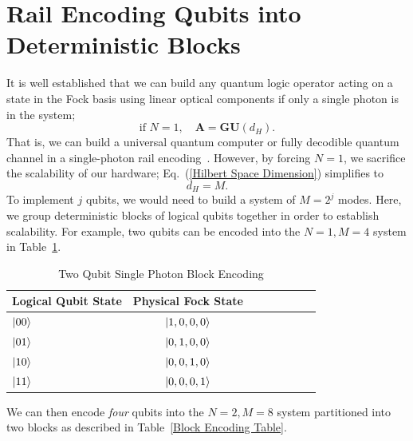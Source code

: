 \documentclass[aps,pra,twocolumn,showpacs,superscriptaddress,floatfix,10pt]{revtex4}
\begin{document}
\section{Rail Encoding Qubits into Deterministic Blocks}
\label{Section Block Encoding}
It is well established that we can build any quantum logic operator acting on a state in the Fock basis using linear optical components if only a single photon is in the system;
\begin{equation}
\label{Isomorphism}
	\mbox{if } N=1, \quad \textbf{A} = \textbf{GU}(d_H).
\end{equation}
That is, we can build a universal quantum computer or fully decodible quantum channel in a single-photon rail encoding~\cite{Adami,Review Paper}. However, by forcing $N=1$, we sacrifice the scalability of our hardware; Eq.~(\ref{Hilbert Space Dimension}) simplifies to
\begin{equation}
d_H = M.
\end{equation}
To implement $j$ qubits, we would need to build a system of $M=2^j$ modes. Here, we group deterministic blocks of logical qubits together in order to establish scalability. For example, two qubits can be encoded into the $N=1,M=4$ system in Table~\ref{Two Qubit Encoding Table}.
\begin {table}[h]
\begin{center}
	\begin{tabular}{l*{6}{c}r} 
		Logical Qubit State      \quad \quad \quad     & Physical Fock State \\
		\hline 
		\quad \quad \quad $\ket{00}$     & $\ket{1,0,0,0}$ \\
		\quad \quad \quad $\ket{01}$            & $\ket{0,1,0,0}$ \\
		\quad \quad \quad $\ket{10}$            & $\ket{0,0,1,0}$ \\
		\quad \quad \quad $\ket{11}$            & $\ket{0,0,0,1}$ \\
	\end{tabular}
	\caption{ \label{Two Qubit Encoding Table} Two Qubit Single Photon Block Encoding}
\end{center}
\end{table}
We can then encode \textit{four} qubits into the $N=2,M=8$ system partitioned into two blocks as described in Table~\ref{Block Encoding Table}.
\end{document}
